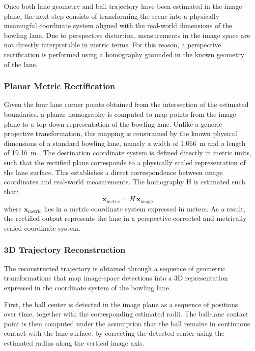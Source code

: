 
Once both lane geometry and ball trajectory have been estimated in the image plane, the next step consists of transforming the scene into a physically meaningful coordinate system aligned with the real-world dimensions of the bowling lane. Due to perspective distortion, measurements in the image space are not directly interpretable in metric terms. For this reason, a perspective rectification is performed using a homography grounded in the known geometry of the lane.
\subsubsection{Planar Metric Rectification}
Given the four lane corner points obtained from the intersection of the estimated boundaries, a planar homography is computed to map points from the image plane to a top-down representation of the bowling lane. Unlike a generic projective transformation, this mapping is constrained by the known physical dimensions of a standard bowling lane, namely a width of 1.066~m and a length of 19.16~m \cite{starsandstrikes2024lanedimensions}.
The destination coordinate system is defined directly in metric units, such that the rectified plane corresponds to a physically scaled representation of the lane surface. This establishes a direct correspondence between image coordinates and real-world measurements.
The homography H is estimated such that:
\[\mathbf{x}_{\mathrm{metric}} = H\,\mathbf{x}_{\mathrm{image}}\]
where $\mathbf{x}_{\mathrm{metric}}$ lies in a metric coordinate system expressed in meters.
As a result, the rectified output represents the lane in a perspective-corrected and metrically scaled coordinate system.


\subsubsection{3D Trajectory Reconstruction}
The reconstructed trajectory is obtained through a sequence of geometric transformations that map image-space detections into a 3D representation expressed in the coordinate system of the bowling lane.

First, the ball center is detected in the image plane as a sequence of positions over time, together with the corresponding estimated radii. The ball-lane contact point is then computed under the assumption that the ball remains in continuous contact with the lane surface, by correcting the detected center using the estimated radius along the vertical image axis.


